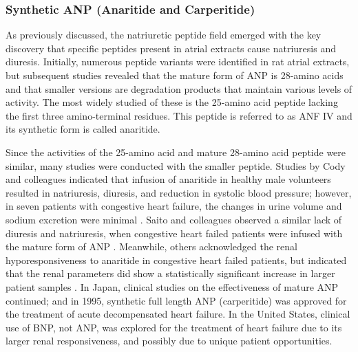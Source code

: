 \documentclass[14pt,a4paper,onecolumn]{article}
\begin{document}
\subsubsection{Synthetic ANP (Anaritide and Carperitide)}
As previously discussed, the natriuretic peptide field emerged with the key discovery that specific peptides present in atrial extracts cause natriuresis and diuresis. Initially, numerous peptide variants were identified in rat atrial extracts, but subsequent studies revealed that the mature form of ANP is 28-amino acids and that smaller versions are degradation products that maintain various levels of activity. The most widely studied of these is the 25-amino acid peptide lacking the first three amino-terminal residues. This peptide is referred to as ANF IV and its synthetic form is called anaritide.

Since the activities of the 25-amino acid and mature 28-amino acid peptide were similar, many studies were conducted with the smaller peptide. Studies by Cody and colleagues indicated that infusion of anaritide in healthy male volunteers resulted in natriuresis, diuresis, and reduction in systolic blood pressure; however, in seven patients with congestive heart failure, the changes in urine volume and sodium excretion were minimal \citep{Cody1986}. Saito and colleagues observed a similar lack of diuresis and natriuresis, when congestive heart failed patients were infused with the mature form of ANP \citep{Saito1987}. Meanwhile, others acknowledged the renal hyporesponsiveness to anaritide in congestive heart failed patients, but indicated that the renal parameters did show a statistically significant increase in larger patient samples \citep{Fifer1990}. In Japan, clinical studies on the effectiveness of mature ANP continued; and in 1995, synthetic full length ANP (carperitide) was approved for the treatment of acute decompensated heart failure. In the United States, clinical use of BNP, not ANP, was explored for the treatment of heart failure due to its larger renal responsiveness, and possibly due to unique patient opportunities.
\end{document}
